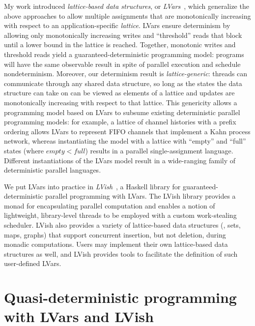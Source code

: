 \documentclass{article}
\begin{document}

My work introduced \emph{lattice-based data structures}, or
\emph{LVars}~\cite{LVars-paper, LVars-TR}, which generalize the above
approaches to allow multiple assignments that are monotonically
increasing with respect to an application-specific \emph{lattice}.
LVars ensure determinism by allowing only monotonically increasing
writes and ``threshold'' reads that block until a lower bound in the
lattice is reached.  Together, monotonic writes and threshold reads
yield a guaranteed-deterministic programming model: programs will have
the same observable result in spite of parallel execution and schedule
nondeterminism.  Moreover, our determinism result is
\emph{lattice-generic}: threads can communicate through any shared
data structure, so long as the states the data structure can take on
can be viewed as elements of a lattice and updates are monotonically
increasing with respect to that lattice.  This genericity allows a
programming model based on LVars to subsume existing deterministic
parallel programming models: for example, a lattice of channel
histories with a prefix ordering allows LVars to represent FIFO
channels that implement a Kahn process network, whereas instantiating
the model with a lattice with ``empty'' and ``full'' states (where
$\mathit{empty} < \mathit{full}$) results in a parallel
single-assignment language.  Different instantiations of the LVars
model result in a wide-ranging family of deterministic parallel
languages.

We put LVars into practice in \emph{LVish}~\cite{LVish}, a Haskell
library for guaranteed-deterministic parallel programming with LVars.
The LVish library provides a monad for encapsulating parallel
computation and enables a notion of lightweight, library-level threads
to be employed with a custom work-stealing scheduler.  LVish also
provides a variety of lattice-based data structures (\eg, sets, maps,
graphs) that support concurrent insertion, but not deletion, during
monadic computations.  Users may implement their own lattice-based
data structures as well, and LVish provides tools to facilitate the
definition of such user-defined LVars.

\section{Quasi-deterministic programming with LVars and LVish}\label{quasi}
\end{document}
